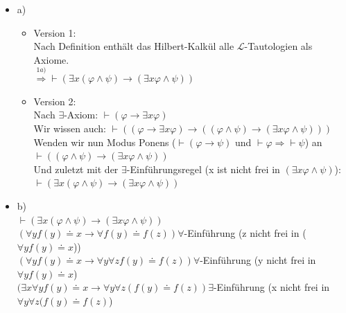 \documentclass[a4paper]{scrartcl}
\begin{document}
    \begin{itemize}
        \item a)\\
            \begin{itemize}
                \item Version 1:\\
                    Nach Definition enthält das Hilbert-Kalkül alle $\mathscr{L}$-Tautologien als Axiome.\\
                    $\overset{1 a)}{\Rightarrow} \vdash (\exists x(\varphi \land \psi) \rightarrow (\exists x \varphi \land \psi))$\\
                \item Version 2:\\
                    Nach $\exists$-Axiom: $\vdash (\varphi \rightarrow \exists x \varphi)$\\
                    Wir wissen auch: $\vdash ((\varphi \rightarrow \exists x \varphi) \rightarrow ((\varphi \land \psi) \rightarrow (\exists x \varphi \land \psi)))$\\
                    Wenden wir nun Modus Ponens ($\vdash (\varphi \rightarrow \psi)$ und $\vdash \varphi \Rightarrow \vdash \psi$) an\\
                    $\vdash ((\varphi \land \psi) \rightarrow (\exists x \varphi \land \psi))$\\
                    Und zuletzt mit der $\exists$-Einführungsregel (x ist nicht frei in $(\exists x \varphi \land \psi)$):\\
                    $\vdash (\exists x(\varphi \land \psi) \rightarrow (\exists x \varphi \land \psi))$\\
            \end{itemize}
        \item b)\\
            $\vdash (\exists x (\varphi \land \psi) \rightarrow (\exists x \varphi \land \psi))$\\
            $(\forall y f(y) \doteq x \rightarrow \forall f(y) \doteq f(z)) \forall$-Einführung (z nicht frei in ($\forall y f(y) \doteq x$))\\
            $(\forall y f(y) \doteq x \rightarrow \forall y \forall z f(y) \doteq f(z)) \forall$-Einführung (y nicht frei in $\forall y f(y) \doteq x$)\\
            $(\exists x \forall y f(y) \doteq x \rightarrow \forall y \forall z (f(y) \doteq f(z)) 
            \exists$-Einführung (x nicht frei in $\forall y \forall z (f(y) \doteq f(z)$)\\

    \end{itemize}%
\end{document}
